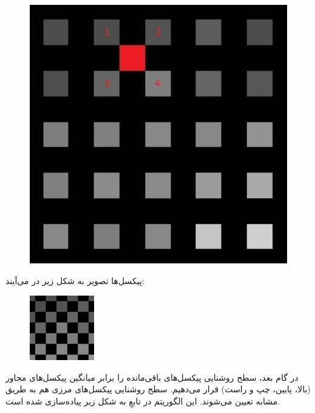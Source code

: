 \documentclass{article}
\begin{document}
\begin{figure}[H]
    \centering
    \includegraphics[width=1.0\textwidth]{figures/5b.jpg}
    \caption
	{}
    \label{fig:fig1}
\end{figure}
پیکسل‌ها تصویر به شکل زیر در می‌آیند:
\begin{figure}[H]
    \centering
    \includegraphics[width=0.25\textwidth]{figures/5c.jpg}
    \caption
	{}
    \label{fig:fig1}
\end{figure}
در گام بعد، سطح روشنایی پیکسل‌های باقی‌مانده را برابر میانگین پیکسل‌های مجاور (بالا، پایین، چپ و راست) قرار می‌دهیم. سطح روشنایی پیکسل‌های مرزی هم به طریق مشابه تعیین می‌شوند. این الگوریتم در تابعِ  به شکل زیر پیاده‌سازی شده است.
\subsection{}
\begin{latin}

\end{latin}
\end{document}
